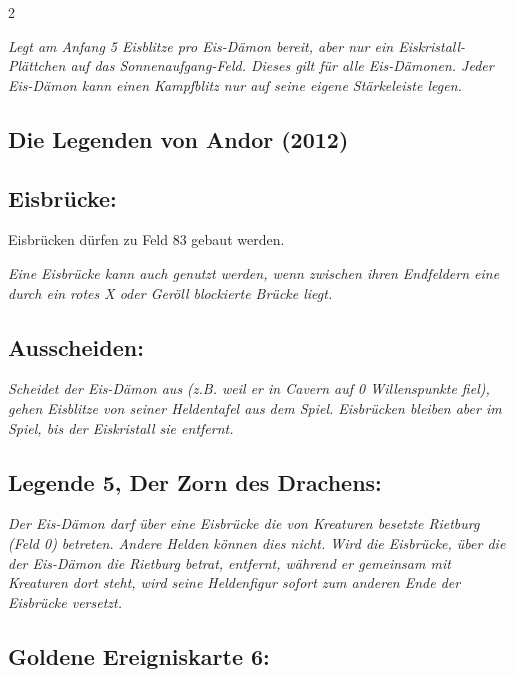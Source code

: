 \documentclass[10pt, a4paper, oneside]{book}
\newcommand{\fan}[1]{\textit{#1}}
\begin{document}
\begin{multicols*}{2}
\begin{nobgcolor}
\fan{Legt am Anfang 5 Eisblitze pro Eis-Dämon bereit, aber nur ein Eiskristall-Plättchen auf das Sonnenaufgang-Feld. Dieses gilt für alle Eis-Dämonen. Jeder Eis-Dämon kann einen Kampfblitz nur auf seine eigene Stärkeleiste legen.}


\end{nobgcolor}



\columnbreak


\begin{bgcolor}
\section{Die Legenden von Andor (2012)}

\subsection{Eisbrücke:}

Eisbrücken dürfen zu Feld 83 gebaut werden. 
\supercite{88778}

\fan{Eine Eisbrücke kann auch genutzt werden, wenn zwischen ihren Endfeldern eine durch ein rotes X oder Geröll blockierte Brücke liegt.}



\subsection{Ausscheiden:}

\fan{Scheidet der Eis-Dämon aus (z.B. weil er in Cavern auf 0 Willenspunkte fiel), gehen Eisblitze von seiner Heldentafel aus dem Spiel. Eisbrücken bleiben aber im Spiel, bis der Eiskristall sie entfernt.}


\subsection{Legende 5, Der Zorn des Drachens:}

\fan{Der Eis-Dämon darf über eine Eisbrücke die von Kreaturen besetzte Rietburg (Feld 0) betreten. Andere Helden können dies nicht. Wird die Eisbrücke, über die der Eis-Dämon die Rietburg betrat, entfernt, während er gemeinsam mit Kreaturen dort steht, wird seine Heldenfigur sofort zum anderen Ende der Eisbrücke versetzt.}




\subsection{Goldene Ereigniskarte 6:}


\end{bgcolor}
\end{multicols*}
\end{document}
